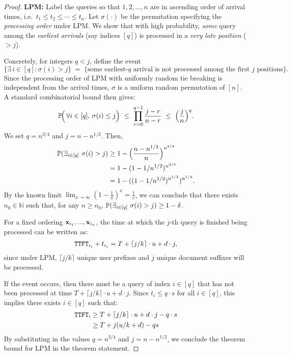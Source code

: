 \begin{proof}

\textbf{LPM:} Label the queries so that $1,2,\dots,n$ are in ascending order of arrival times, i.e.\ $t_1\le t_2\le \cdots \le t_n$.  Let $\sigma(\cdot)$ be the permutation specifying the \emph{processing order} under LPM.  We show that with high probability, \emph{some} query among the \emph{earliest arrivals} (say indices $[q]$) is processed in a \emph{very late position} ($> j$).

Concretely, for integers $q<j$, define the event
\[
\bigl\{\exists\,i \in [q] : \sigma(i)> j\bigr\}
\;=\;
\bigl\{\text{some earliest-$q$ arrival is not processed among the first $j$ positions}\bigr\}.
\]
Since the processing order of LPM with uniformly random tie breaking is independent from the arrival times, $\sigma$ is a uniform random permutation of $[n]$. A standard combinatorial bound then gives:
\[
\mathbb{P}\!\Bigl(\,\forall i\in[q],\,\sigma(i)\le j\Bigr)
~\le~
\prod_{r=0}^{q-1} \frac{j-r}{n-r}
~\le~
\Bigl(\frac{j}{n}\Bigr)^q.
\]
We set $q = n^{3/4}$ and $j = n - n^{1/2}$. Then,
\begin{align*}
    \mathbb{P}(\exists_{i \in [q]} ~ \sigma(i) > j)
    &\geq 1 - \Big(\frac{n - n^{1/2}}{n}\Big)^{n^{3/4}} \\
    &= 1 - (1 - 1/n^{1/2})^{n^{3/4}} \\
    &= 1 - ((1 - 1/n^{1/2})^{n^{1/2}})^{n^{1/4}}.
\end{align*}
By the known limit $\lim_{x \rightarrow \infty} (1 - \frac{1}{x})^x = \frac{1}{e}$, we can conclude that there exists $n_0 \in \mathbb{N}$ such that, for any $n \geq n_0$, $\mathbb{P}(\exists_{i \in [q]} ~ \sigma(i) > j) \geq 1 - \delta$.



For a fixed ordering $\mathbf{x}_{i_1},...,\mathbf{x}_{i_n}$, the time at which the $j$-th query is finished being processed can be written as:
\begin{gather}\label{eqn:q_to_j_prob}
    \texttt{TTFT}_{i_j} + t_{i_j} = T + \lceil j / k \rceil \cdot u + d \cdot j,
\end{gather}
since under LPM, $\lceil j / k \rceil$ unique user prefixes and $j$ unique document suffixes will be processed.


If the event occurs, then there must be a query of index $i \in [q]$ that has not been processed at time $T + \lceil j/k \rceil \cdot u + d \cdot j$. Since $t_i \leq q \cdot s$ for all $i \in [q]$, this implies there exists $i \in [q]$ such that:
\begin{gather*}
    \texttt{TTFT}_i \geq T + \lceil j/k \rceil \cdot u + d \cdot j - q \cdot s \\
    \geq T + j(u/k + d) - qs
\end{gather*}
By substituting in the values $q = n^{3/4}$ and $j = n - n^{1/2}$, we conclude the theorem bound for LPM in the theorem statement.



\end{proof}
